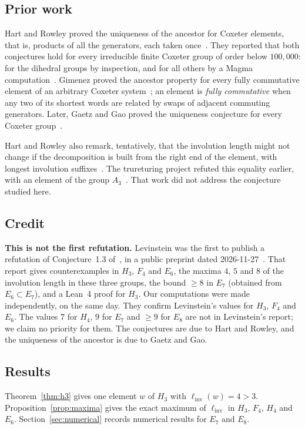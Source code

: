 \documentclass[11pt]{amsart}
\theoremstyle{definition}\newtheorem{definition}[theorem]{Definition}
\theoremstyle{remark}\newtheorem{remark}[theorem]{Remark}
\newcommand{\linv}{\ell_{\mathrm{inv}}}
\begin{document}
\subsection*{Prior work}
Hart and Rowley proved the uniqueness of the ancestor for Coxeter elements, that is, products of all the generators, each taken once~\cite[Prop.~2.2]{HR}. They reported that both conjectures hold for every irreducible finite Coxeter group of order below \(100{,}000\): for the dihedral groups by inspection, and for all others by a Magma computation~\cite[\S3]{HR}. Gimenez proved the ancestor property for every fully commutative element of an arbitrary Coxeter system~\cite{Gim}; an element is \emph{fully commutative} when any two of its shortest words are related by swaps of adjacent commuting generators. Later, Gaetz and Gao proved the uniqueness conjecture for every Coxeter group~\cite[Cor.~1.2]{GG}.

Hart and Rowley also remark, tentatively, that the involution length might not change if the decomposition is built from the right end of the element, with longest involution suffixes~\cite[\S3]{HR}. The trureturing project refuted this equality earlier, with an element of the group \(A_3\)~\cite{OmegaPR}. That work did not address the conjecture studied here.

\subsection*{Credit}
\textbf{This is not the first refutation.} Levinstein was the first to publish a refutation of Conjecture~1.3 of~\cite{HR}, in a public preprint dated 2026-11-27~\cite{Lev}. That report gives counterexamples in \(H_3\), \(F_4\) and \(E_6\), the maxima \(4\), \(5\) and \(8\) of the involution length in these three groups, the bound \(\ge 8\) in \(E_7\) (obtained from \(E_6\subset E_7\)), and a Lean~4 proof for \(H_3\). Our computations were made independently, on the same day. They confirm Levinstein's values for \(H_3\), \(F_4\) and \(E_6\). The values \(7\) for \(H_4\), \(9\) for \(E_7\) and \(\ge 9\) for \(E_8\) are not in Levinstein's report; we claim no priority for them. The conjectures are due to Hart and Rowley, and the uniqueness of the ancestor is due to Gaetz and Gao.

\subsection*{Results}
Theorem~\ref{thm:h3} gives one element \(w\) of \(H_3\) with \(\linv(w)=4>3\). Proposition~\ref{prop:maxima} gives the exact maximum of \(\linv\) in \(H_3\), \(F_4\), \(H_4\) and \(E_6\). Section~\ref{sec:numerical} records numerical results for \(E_7\) and \(E_8\).
\end{document}
